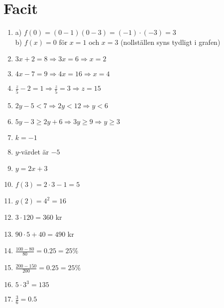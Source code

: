 \documentclass[a4paper,11pt]{article}
\begin{document}
\section*{Facit}
\begin{enumerate}[label=\textbf{\arabic*.}]
    \item a) $f(0) = (0-1)(0-3) = (-1)\cdot(-3) = 3$
    \\b) $f(x) = 0$ för $x = 1$ och $x = 3$ (nollställen syns tydligt i grafen)

    \item $3x + 2 = 8 \Rightarrow 3x = 6 \Rightarrow x = 2$
    \item $4x - 7 = 9 \Rightarrow 4x = 16 \Rightarrow x = 4$
    \item $\frac{z}{5} - 2 = 1 \Rightarrow \frac{z}{5} = 3 \Rightarrow z = 15$
    \item $2y - 5 < 7 \Rightarrow 2y < 12 \Rightarrow y < 6$
    \item $5y - 3 \geq 2y + 6 \Rightarrow 3y \geq 9 \Rightarrow y \geq 3$
    \item $k = -1$
    \item $y$-värdet är $-5$
    \item $y = 2x + 3$
    \item $f(3) = 2 \cdot 3 - 1 = 5$
    \item $g(2) = 4^2 = 16$
    \item $3 \cdot 120 = 360$ kr
    \item $90 \cdot 5 + 40 = 490$ kr
    \item $\frac{100-80}{80} = 0.25 = 25\%$
    \item $\frac{200-150}{200} = 0.25 = 25\%$
    \item $5 \cdot 3^3 = 135$
    \item $\frac{3}{6} = 0.5$
\end{enumerate}
\end{document}
